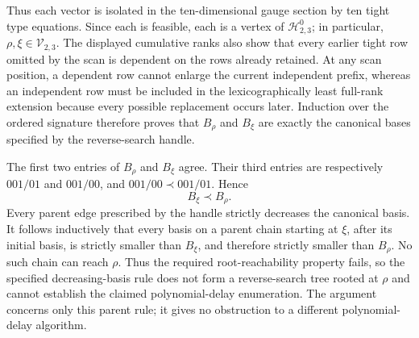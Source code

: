 Thus each vector is isolated in the ten-dimensional gauge section by ten tight type equations. Since each is feasible, each is a vertex of \(\mathcal H^0_{2,3}\); in particular, \(\rho,\xi\in\mathcal V_{2,3}\). The displayed cumulative ranks also show that every earlier tight row omitted by the scan is dependent on the rows already retained. At any scan position, a dependent row cannot enlarge the current independent prefix, whereas an independent row must be included in the lexicographically least full-rank extension because every possible replacement occurs later. Induction over the ordered signature therefore proves that \(B_{\rho}\) and \(B_{\xi}\) are exactly the canonical bases specified by the reverse-search handle.

The first two entries of \(B_{\rho}\) and \(B_{\xi}\) agree. Their third entries are respectively \(001/01\) and \(001/00\), and \(001/00\prec001/01\). Hence
\[
B_{\xi}\prec B_{\rho}.
\]
Every parent edge prescribed by the handle strictly decreases the canonical basis. It follows inductively that every basis on a parent chain starting at \(\xi\), after its initial basis, is strictly smaller than \(B_{\xi}\), and therefore strictly smaller than \(B_{\rho}\). No such chain can reach \(\rho\). Thus the required root-reachability property fails, so the specified decreasing-basis rule does not form a reverse-search tree rooted at \(\rho\) and cannot establish the claimed polynomial-delay enumeration. The argument concerns only this parent rule; it gives no obstruction to a different polynomial-delay algorithm.